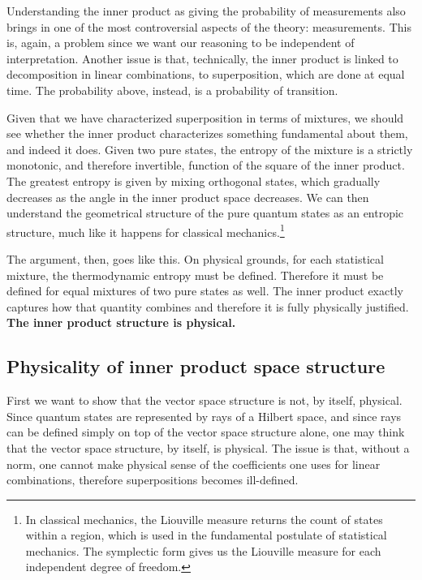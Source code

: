 \documentclass[10pt,twocolumn, nofootinbib]{revtex4-2}
\begin{document}
Understanding the inner product as giving the probability of measurements also brings in one of the most controversial aspects of the theory: measurements. This is, again, a problem since we want our reasoning to be independent of interpretation. Another issue is that, technically, the inner product is linked to decomposition in linear combinations, to superposition, which are done at equal time. The probability above, instead, is a probability of transition.

Given that we have characterized superposition in terms of mixtures, we should see whether the inner product characterizes something fundamental about them, and indeed it does. Given two pure states, the entropy of the mixture is a strictly monotonic, and therefore invertible, function of the square of the inner product. The greatest entropy is given by mixing orthogonal states, which gradually decreases as the angle in the inner product space decreases. We can then understand the geometrical structure of the pure quantum states as an entropic structure, much like it happens for classical mechanics.\footnote{In classical mechanics, the Liouville measure returns the count of states within a region, which is used in the fundamental postulate of statistical mechanics. The symplectic form gives us the Liouville measure for each independent degree of freedom.}

The argument, then, goes like this. On physical grounds, for each statistical mixture, the thermodynamic entropy must be defined. Therefore it must be defined for equal mixtures of two pure states as well. The inner product exactly captures how that quantity combines and therefore it is fully physically justified. \textbf{The inner product structure is physical.}


\subsection{Physicality of inner product space structure}

First we want to show that the vector space structure is not, by itself, physical. Since quantum states are represented by rays of a Hilbert space, and since rays can be defined simply on top of the vector space structure alone, one may think that the vector space structure, by itself, is physical. The issue is that, without a norm, one cannot make physical sense of the coefficients one uses for linear combinations, therefore superpositions becomes ill-defined.
\end{document}
